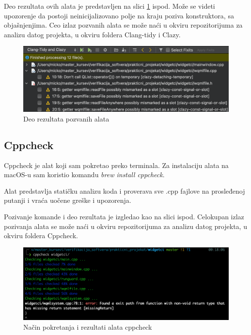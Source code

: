 \documentclass[a4paper]{article}
\begin{document}
\newpage
Deo rezultata ovih alata je predstavljen na slici \ref{fig: clang-tidy-3} ispod. Može se videti upozorenje da postoji neinicijalizovano polje na kraju poziva konstruktora, sa objašnjenjima. 
Ceo izlaz pozvanih alata se može naći u okviru repozitorijuma za analizu datog projekta, u okviru foldera Clang-tidy i Clazy.

\begin{figure}[h!]
\begin{center}
\includegraphics[scale=0.45]{clang-tidy-03.png}
\end{center}
\caption{Deo rezultata pozvanih alata}
\label{fig: clang-tidy-3}
\end{figure}

\subsection{Cppcheck}
Cppcheck je alat koji sam pokretao preko terminala. Za instalaciju alata na macOS-u sam koristio komandu \textit{brew install cppcheck}.

Alat predstavlja statičku analizu koda i proverava sve .cpp fajlove na prosleđenoj putanji i vraća uočene greške i upozorenja.

Pozivanje komande i deo rezultata je izgledao kao na slici ispod.
Celokupan izlaz pozivanja alata se može naći u okviru repozitorijuma za analizu datog projekta, u okviru foldera Cppcheck.

\begin{figure}[h!]
\begin{center}
\includegraphics[scale=0.45]{cppcheck-00.png}
\end{center}
\caption{Način pokretanja i rezultati alata cppcheck}
\label{fig: cppcheck-0}
\end{figure}
\end{document}
